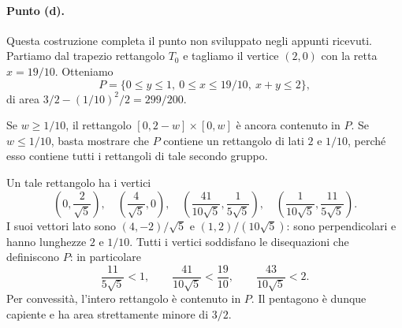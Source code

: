{\paragraph{Punto (d).}
Questa costruzione completa il punto non sviluppato negli appunti ricevuti. Partiamo dal trapezio rettangolo $T_0$ e tagliamo il vertice $(2,0)$ con la retta $x=19/10$. Otteniamo
\[
P=\{0\leq y\leq1,\ 0\leq x\leq19/10,\ x+y\leq2\},
\]
di area $3/2-(1/10)^2/2=299/200$.

Se $w\geq1/10$, il rettangolo $[0,2-w]\times[0,w]$ è ancora contenuto in $P$. Se $w\leq1/10$, basta mostrare che $P$ contiene un rettangolo di lati $2$ e $1/10$, perché esso contiene tutti i rettangoli di tale secondo gruppo.

Un tale rettangolo ha i vertici
\[
\left(0,\frac2{\sqrt5}\right),\quad
\left(\frac4{\sqrt5},0\right),\quad
\left(\frac{41}{10\sqrt5},\frac1{5\sqrt5}\right),\quad
\left(\frac1{10\sqrt5},\frac{11}{5\sqrt5}\right).
\]
I suoi vettori lato sono $(4,-2)/\sqrt5$ e $(1,2)/(10\sqrt5)$: sono perpendicolari e hanno lunghezze $2$ e $1/10$. Tutti i vertici soddisfano le disequazioni che definiscono $P$: in particolare
\[
\frac{11}{5\sqrt5}<1,\qquad
\frac{41}{10\sqrt5}<\frac{19}{10},\qquad
\frac{43}{10\sqrt5}<2.
\]
Per convessità, l'intero rettangolo è contenuto in $P$. Il pentagono è dunque capiente e ha area strettamente minore di $3/2$.
}
